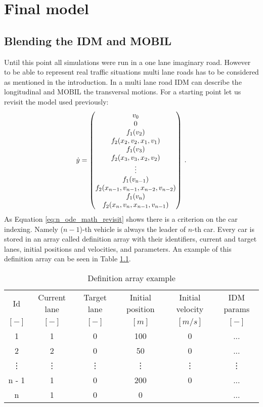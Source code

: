 \chapter{Final model}
	\section{Blending the IDM and MOBIL}
		Until this point all simulations were run in a one lane imaginary road. However to be able to represent real traffic situations multi lane roads has to be considered as mentioned in the introduction. In a multi lane road IDM can describe the longitudinal and MOBIL the transversal motions. For a starting point let us revisit the model used previously:
		\begin{equation}
			\dot{y}=
			\begin{pmatrix}
			v_0\\
			0\\
			f_1(v_{2})\\
			f_2(x_{2}, v_{2},x_{1}, v_{1})\\
			f_1(v_{3})\\
			f_2(x_{3}, v_{3},x_{2}, v_{2})\\
			\vdots\\
			f_1(v_{\rm n-1})\\
			f_2(x_{n-1}, v_{n-1},x_{n-2}, v_{n-2})\\
			f_1(v_{\rm n})\\
			f_2(x_{n}, v_{n},x_{n-1}, v_{n-1})
			\end{pmatrix}\,.
			\label{eq:n_ode_math_revisit}
		\end{equation}
		As Equation \ref{eq:n_ode_math_revisit} shows there is a criterion on the car indexing.  Namely ($n-1$)-th vehicle is always the leader of $n$-th car. Every car is stored in an array called definition array with their identifiers,  current and target lanes, initial positions and velocities, and parameters. An example of this definition array can be seen in Table \ref{tab:definition_array}.
		\begin{table}
			\begin{center}
				\begin{tabular}{ |c|c|c|c|c|c| }
					\hline
					Id & Current lane & Target lane & Initial position & Initial velocity& IDM params\\
					$[-]$ & $[-]$ & $[-]$ & $[m]$ & $[m/s]$ & $[-]$\\
					\hline
					1 & 1 & 0 & 100 & 0 & ...\\
					2 & 2 & 0 & 50 & 0 & ...\\
					\vdots & \vdots & \vdots & \vdots & \vdots & \vdots\\
					n - 1 & 1 & 0 & 200 & 0 & ...\\
					n & 1 & 0 & 0 &  & ...\\
					\hline
				\end{tabular}
			\end{center}
			\caption{Definition array example}
			\label{tab:definition_array}
		\end{table}
